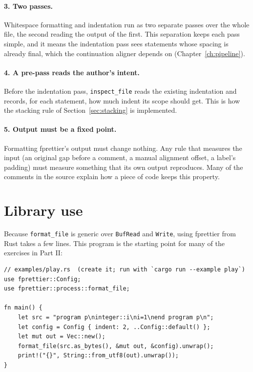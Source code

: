 \documentclass[11pt,a4paper,openany]{book}
\newcommand{\code}[1]{\texttt{\small #1}}
\newcounter{exercise}[chapter]
\begin{document}
\paragraph{3. Two passes.} Whitespace formatting and indentation run as two
separate passes over the whole file, the second reading the output of the
first. This separation keeps each pass simple, and it means the indentation pass
sees statements whose spacing is already final, which the continuation
aligner depends on (Chapter~\ref{ch:pipeline}).

\paragraph{4. A pre-pass reads the author's intent.} Before the indentation
pass, \code{inspect\_file} reads the existing indentation and records, for each
statement, how much indent its scope should get. This is how the stacking rule
of Section~\ref{sec:stacking} is implemented.

\paragraph{5. Output must be a fixed point.} Formatting fprettier's output
must change nothing. Any rule that measures the input (an original gap before a
comment, a manual alignment offset, a label's padding) must measure something
that its own output reproduces. Many of the comments in the source explain how
a piece of code keeps this property.

\section{Library use}

Because \code{format\_file} is generic over \code{BufRead} and \code{Write},
using fprettier from Rust takes a few lines. This program is the starting
point for many of the exercises in Part II:

\begin{lstlisting}[style=rust]
// examples/play.rs  (create it; run with `cargo run --example play`)
use fprettier::Config;
use fprettier::process::format_file;

fn main() {
    let src = "program p\ninteger::i\ni=1\nend program p\n";
    let config = Config { indent: 2, ..Config::default() };
    let mut out = Vec::new();
    format_file(src.as_bytes(), &mut out, &config).unwrap();
    print!("{}", String::from_utf8(out).unwrap());
}
\end{lstlisting}
\end{document}
